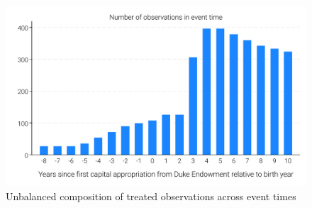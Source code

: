 \documentclass[12pt]{article}
\begin{document}
\begin{figure}[ht]
  \centering
  \includegraphics[width=.75\linewidth]{../analysis/output/appendix/figure_F3_unbalanced_event_time_long_run.pdf}
  \caption{Unbalanced composition of treated observations across event times}
  \label{fig:lr-unbalanced-event-time}
\end{figure}
\end{document}
